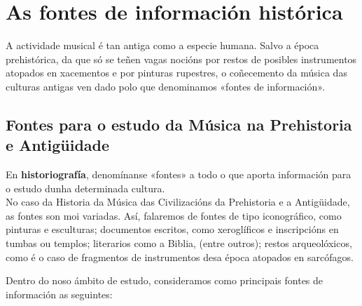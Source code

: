 \documentclass[a4paper, twoside]{templates/ociamthesis}
\begin{document}
\minitoc 

\hypertarget{as-fontes-de-informaciuxf3n-histuxf3rica}{%
\section*{As fontes de información histórica}\label{as-fontes-de-informaciuxf3n-histuxf3rica}}

A actividade musical é tan antiga como a especie humana. Salvo a época prehistórica, da que só se teñen vagas nocións por restos de posibles instrumentos atopados en xacementos e por pinturas rupestres, o coñecemento da música das culturas antigas ven dado polo que denominamos «fontes de información».

\hypertarget{fontes-para-o-estudo-da-muxfasica-na-prehistoria-e-antiguxfcidade}{%
\subsection*{Fontes para o estudo da Música na Prehistoria e Antigüidade}\label{fontes-para-o-estudo-da-muxfasica-na-prehistoria-e-antiguxfcidade}}

En \textbf{historiografía}, denomínanse «fontes» a todo o que aporta información para o estudo dunha determinada cultura.\\
No caso da Historia da Música das Civilizacións da Prehistoria e a Antigüidade, as fontes son moi variadas. Así, falaremos de fontes de tipo iconográfico, como pinturas e esculturas; documentos escritos, como xeroglíficos e inscripcións en tumbas ou templos; literarios como a Biblia, (entre outros); restos arqueolóxicos, como é o caso de fragmentos de instrumentos desa época atopados en sarcófagos.

Dentro do noso ámbito de estudo, consideramos como principais fontes de información as seguintes:
\end{document}
